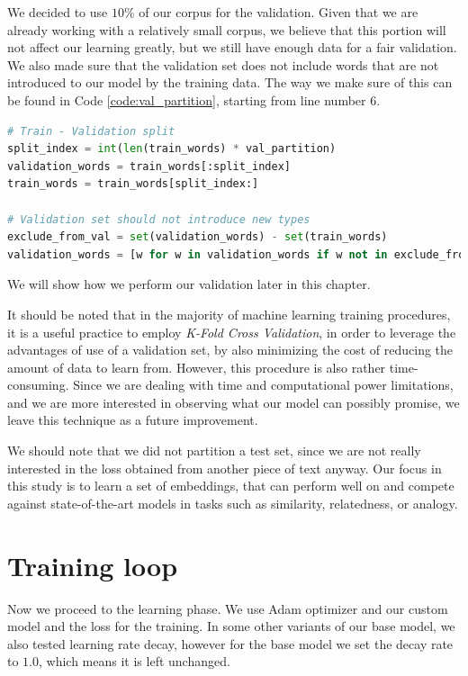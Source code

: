 We decided to use $10\%$ of our corpus for the validation. Given that we are already working with a relatively small corpus, we believe that this portion will not affect our learning greatly, but we still have enough data for a fair validation. We also made sure that the validation set does not include words that are not introduced to our model by the training data. The way we make sure of this can be found in Code \ref{code:val_partition}, starting from line number $6$.

\begin{lstlisting}[language=Python, caption=Training and Validation Set Split, label={code:val_partition}]
# Train - Validation split
split_index = int(len(train_words) * val_partition)
validation_words = train_words[:split_index]
train_words = train_words[split_index:]

# Validation set should not introduce new types
exclude_from_val = set(validation_words) - set(train_words)
validation_words = [w for w in validation_words if w not in exclude_from_val]

\end{lstlisting}

We will show how we perform our validation later in this chapter.

It should be noted that in the majority of machine learning training procedures, it is a useful practice to employ \textit{K-Fold Cross Validation}, in order to leverage the advantages of use of a validation set, by also minimizing the cost of reducing the amount of data to learn from. However, this procedure is also rather time-consuming. Since we are dealing with time and computational power limitations, and we are more interested in observing what our model can possibly promise, we leave this technique as a future improvement.

We should note that we did not partition a test set, since we are not really interested in the loss obtained from another piece of text anyway. Our focus in this study is to learn a set of embeddings, that can perform well on and compete against state-of-the-art models in tasks such as similarity, relatedness, or analogy.

\section{Training loop}

Now we proceed to the learning phase. We use Adam optimizer and our custom model and the loss for the training. In some other variants of our base model, we also tested learning rate decay, however for the base model we set the decay rate to $1.0$, which means it is left unchanged.

